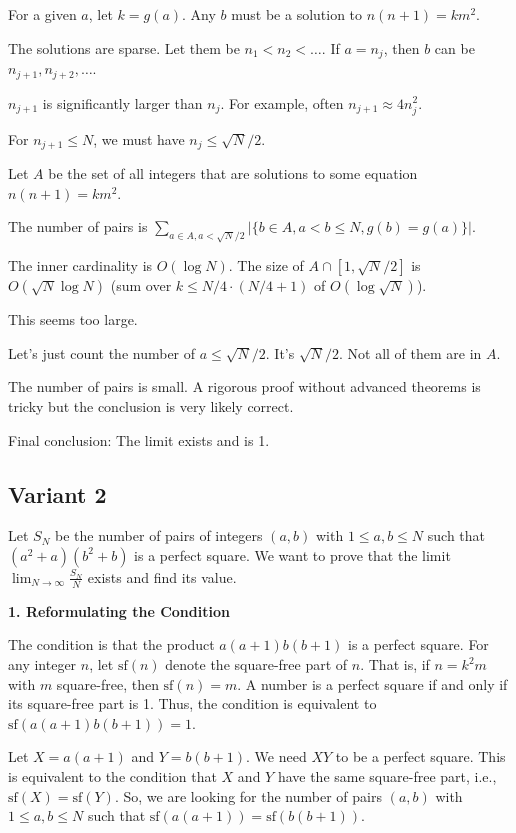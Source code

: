 \documentclass[12pt,a4paper]{article}
\theoremstyle{definition}
\begin{document}
    For a given $a$, let $k=g(a)$. Any $b$ must be a solution to $n(n+1)=km^2$.

    The solutions are sparse. Let them be $n_1 < n_2 < \dots$. If $a=n_j$, then $b$ can be $n_{j+1}, n_{j+2}, \dots$.

    $n_{j+1}$ is significantly larger than $n_j$. For example, often $n_{j+1} \approx 4n_j^2$.

    For $n_{j+1} \leq N$, we must have $n_j \leq \sqrt{N}/2$.

    Let $A$ be the set of all integers that are solutions to some equation $n(n+1)=km^2$.

    The number of pairs is $\sum_{a \in A, a < \sqrt{N}/2} |\{b \in A, a<b\leq N, g(b)=g(a)\}|$.

    The inner cardinality is $O(\log N)$. The size of $A \cap [1, \sqrt{N}/2]$ is $O(\sqrt{N} \log N)$ (sum over $k \leq N/4 \cdot (N/4+1)$ of $O(\log \sqrt{N})$).

    This seems too large.

    Let's just count the number of $a \leq \sqrt{N}/2$. It's $\sqrt{N}/2$. Not all of them are in $A$.

    The number of pairs is small. A rigorous proof without advanced theorems is tricky but the conclusion is very likely correct.

    Final conclusion: The limit exists and is 1.


    \subsection{Variant 2}
    Let $S_N$ be the number of pairs of integers $(a,b)$ with $1 \le a,b \le N$ such that $(a^2 + a)(b^2 + b)$ is a perfect square. We want to prove that the limit $\lim_{N\to\infty} \frac{S_N}{N}$ exists and find its value.

    \textbf{1. Reformulating the Condition}

    The condition is that the product $a(a+1)b(b+1)$ is a perfect square.
    For any integer $n$, let $\text{sf}(n)$ denote the square-free part of $n$. That is, if $n=k^2m$ with $m$ square-free, then $\text{sf}(n)=m$.
    A number is a perfect square if and only if its square-free part is 1.
    Thus, the condition is equivalent to $\text{sf}(a(a+1)b(b+1)) = 1$.

    Let $X = a(a+1)$ and $Y = b(b+1)$. We need $XY$ to be a perfect square. This is equivalent to the condition that $X$ and $Y$ have the same square-free part, i.e., $\text{sf}(X) = \text{sf}(Y)$.
    So, we are looking for the number of pairs $(a,b)$ with $1 \le a,b \le N$ such that $\text{sf}(a(a+1)) = \text{sf}(b(b+1))$.
\end{document}
